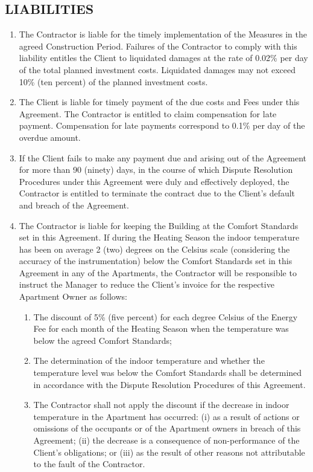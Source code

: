 \begin{multicols}{2}
\subsection{LIABILITIES}
\begin{enumerate}
	\item	The Contractor is liable for the timely implementation of the Measures in the agreed Construction Period. Failures of the Contractor to comply with this liability entitles the Client to liquidated damages at the rate of 0.02\% per day of the total planned investment costs. Liquidated damages may not exceed 10\% (ten percent) of the planned investment costs.
	\item	The Client is liable for timely payment of the due costs and Fees under this Agreement. The Contractor is entitled to claim compensation for late payment. Compensation for late payments correspond to 0.1\% per day of the overdue amount.
	\item	If the Client fails to make any payment due and arising out of the Agreement for more than 90 (ninety) days, in the course of which Dispute Resolution Procedures under this Agreement were duly and effectively deployed, the Contractor is entitled to terminate the contract due to the Client’s default and breach of the Agreement.
	\item	The Contractor is liable for keeping the Building at the Comfort Standards set in this Agreement. If during the Heating Season the indoor temperature has been on average 2 (two) degrees on the Celsius scale (considering the accuracy of the instrumentation) below the Comfort Standards set in this Agreement in any of the Apartments, the Contractor will be responsible to instruct the Manager to reduce the Client’s invoice for the respective Apartment Owner as follows:
	\begin{enumerate}
		\item	The discount of 5\% (five percent) for each degree Celsius of the Energy Fee for each month of the Heating Season when the temperature was below the agreed Comfort Standards;
		\item	The determination of the indoor temperature and whether the temperature level was below the Comfort Standards shall be determined in accordance with the Dispute Resolution Procedures of this Agreement.
		\item	The Contractor shall not apply the discount if the decrease in indoor temperature in the Apartment has occurred: (i) as a result of actions or omissions of the occupants or of the Apartment owners in breach of this Agreement; (ii) the decrease is a consequence of non-performance of the Client’s obligations; or (iii) as the result of other reasons not attributable to the fault of the Contractor.

\end{enumerate}
\end{enumerate}
\end{multicols}
